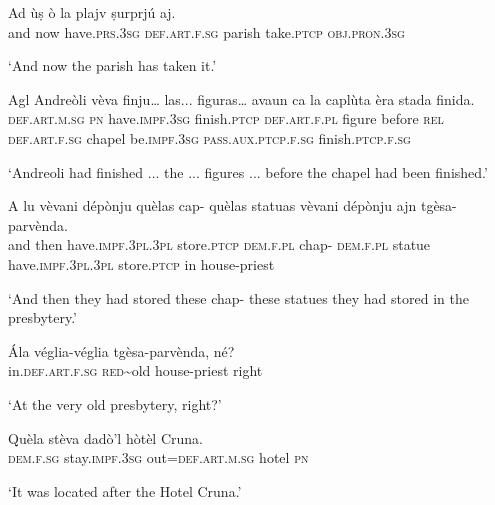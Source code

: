 \begin{linenumbers}
\gll  Ad ùṣ ò la plajv ṣurprjú aj.  \\
and now have.\textsc{prs.3sg} \textsc{def.art.f.sg} parish take.\textsc{ptcp} \textsc{obj.pron.3sg}  \\
\end{linenumbers}
\medskip
\glt `And now the parish has taken it.'
\medskip

\begin{linenumbers}
\gll  Agl Andreòli vèva finju… las... figuras… avaun ca la caplùta èra stada finida. \\
 \textsc{def.art.m.sg} \textsc{pn} have.\textsc{impf.3sg} finish.\textsc{ptcp} \textsc{def.art.f.pl} figure before \textsc{rel}  \textsc{def.art.f.sg} chapel be.\textsc{impf.3sg} \textsc{pass.aux.ptcp.f.sg} finish.\textsc{ptcp.f.sg} \\
\end{linenumbers}
\medskip
\glt `Andreoli had finished ... the ... figures ... before the chapel had been finished.'
\medskip

\begin{linenumbers}
\gll  A lu vèvani dépònju quèlas cap- quèlas statuas vèvani dépònju ajn tgèsa-parvènda.\\
and then have.\textsc{impf.3pl.3pl} store.\textsc{ptcp} \textsc{dem.f.pl} chap- \textsc{dem.f.pl} statue have.\textsc{impf.3pl.3pl} store.\textsc{ptcp} in house-priest\\
\end{linenumbers}
\medskip
\glt `And then they had stored these chap- these statues they had stored in the presbytery.'
\medskip

\begin{linenumbers}
\gll  Ála véglia-véglia tgèsa-parvènda, né?  \\
 in.\textsc{def.art.f.sg} \textsc{red}\textasciitilde{old} house-priest right  \\
\end{linenumbers}
\medskip
\glt `At the very old presbytery, right?'
\medskip

\begin{linenumbers}
\gll  Quèla stèva dadò’l hòtèl Cruna.  \\
 \textsc{dem.f.sg} stay.\textsc{impf.3sg} out=\textsc{def.art.m.sg} hotel \textsc{pn}  \\
\end{linenumbers}
\medskip
\glt `It was located after the Hotel Cruna.'
\medskip

